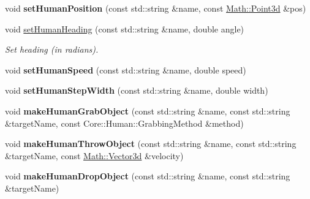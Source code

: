 \begin{DoxyCompactItemize}
\item 
\hypertarget{classCartWheel_1_1CartWheel3D_a5ccbf0f48668c2453b8f7c52e10cf57b}{
void {\bfseries setHumanPosition} (const std::string \&name, const \hyperlink{classCartWheel_1_1Math_1_1Point3d}{Math::Point3d} \&pos)}
\label{classCartWheel_1_1CartWheel3D_a5ccbf0f48668c2453b8f7c52e10cf57b}

\item 
\hypertarget{classCartWheel_1_1CartWheel3D_a95fd5ae663e025416d26c73175767c28}{
void \hyperlink{classCartWheel_1_1CartWheel3D_a95fd5ae663e025416d26c73175767c28}{setHumanHeading} (const std::string \&name, double angle)}
\label{classCartWheel_1_1CartWheel3D_a95fd5ae663e025416d26c73175767c28}

\begin{DoxyCompactList}\small\item\em Set heading (in radians). \item\end{DoxyCompactList}\item 
\hypertarget{classCartWheel_1_1CartWheel3D_a92f0b9c03e1c8a67526901cd94d7fcd3}{
void {\bfseries setHumanSpeed} (const std::string \&name, double speed)}
\label{classCartWheel_1_1CartWheel3D_a92f0b9c03e1c8a67526901cd94d7fcd3}

\item 
\hypertarget{classCartWheel_1_1CartWheel3D_af4069945a2b050cd26dcbf04b115f274}{
void {\bfseries setHumanStepWidth} (const std::string \&name, double width)}
\label{classCartWheel_1_1CartWheel3D_af4069945a2b050cd26dcbf04b115f274}

\item 
\hypertarget{classCartWheel_1_1CartWheel3D_aed642e084931f023606d9c28def94ccc}{
void {\bfseries makeHumanGrabObject} (const std::string \&name, const std::string \&targetName, const Core::Human::GrabbingMethod \&method)}
\label{classCartWheel_1_1CartWheel3D_aed642e084931f023606d9c28def94ccc}

\item 
\hypertarget{classCartWheel_1_1CartWheel3D_a2f2b825aefa1dc9015fdbdb2ec161cac}{
void {\bfseries makeHumanThrowObject} (const std::string \&name, const std::string \&targetName, const \hyperlink{classCartWheel_1_1Math_1_1Vector3d}{Math::Vector3d} \&velocity)}
\label{classCartWheel_1_1CartWheel3D_a2f2b825aefa1dc9015fdbdb2ec161cac}

\item 
\hypertarget{classCartWheel_1_1CartWheel3D_ab8dd4e2d39277f8498963c1624740ad9}{
void {\bfseries makeHumanDropObject} (const std::string \&name, const std::string \&targetName)}
\label{classCartWheel_1_1CartWheel3D_ab8dd4e2d39277f8498963c1624740ad9}


\end{DoxyCompactItemize}

